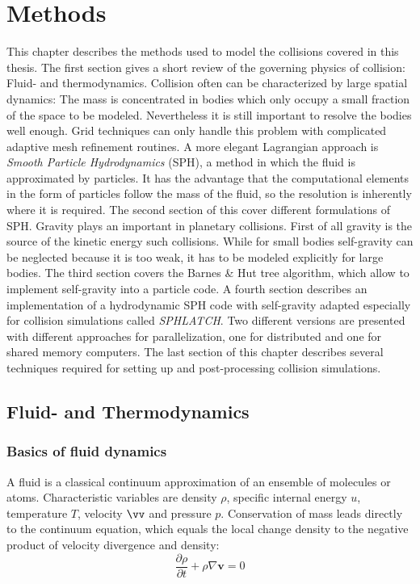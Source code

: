 \chapter{Methods}
\graphicspath{{./02figs/}}
\label{ch02}
This chapter describes the methods used to model the collisions covered in this thesis. The first section gives a short review of the governing physics of collision: Fluid- and thermodynamics.  Collision often can be characterized by large spatial dynamics: The mass is concentrated in bodies which only occupy a small fraction of the space to be modeled. Nevertheless it is still important to resolve the bodies well enough. Grid techniques can only handle this problem with complicated adaptive mesh refinement routines. 
A more elegant Lagrangian approach is \emph{Smooth Particle Hydrodynamics} (SPH), a method in which the fluid is approximated by particles. It has the advantage that the computational elements in the form of particles follow the mass of the fluid, so the resolution is inherently where it is required. The second section of this cover different formulations of SPH.
Gravity plays an important in planetary collisions. First of all gravity is the source of the kinetic energy such collisions. While for small bodies self-gravity can be neglected because it is too weak, it has to be modeled explicitly for large bodies. The third section covers the Barnes \& Hut tree algorithm, which allow to implement self-gravity into a particle code.
A fourth section describes an implementation of a hydrodynamic SPH code with self-gravity adapted especially for collision simulations called \emph{SPHLATCH}. Two different versions are presented with different approaches for parallelization, one for distributed and one for shared memory computers.
The last section of this chapter describes several techniques required for setting up and post-processing collision simulations.

\newpage

\section{Fluid- and Thermodynamics}

\subsection{Basics of fluid dynamics}
A fluid is a classical continuum approximation of an ensemble of molecules or atoms. Characteristic variables are density $\rho$, specific internal energy $u$, temperature $T$, velocity $\vv$ and pressure $p$. Conservation of mass leads directly to the continuum equation, which equals the local change density to the negative product of velocity divergence and density:
\begin{equation}
\label{ch02_fld01_eq001}
\frac{\partial \rho}{\partial t} + \rho \nabla \mathbf{v} = 0
\end{equation}

